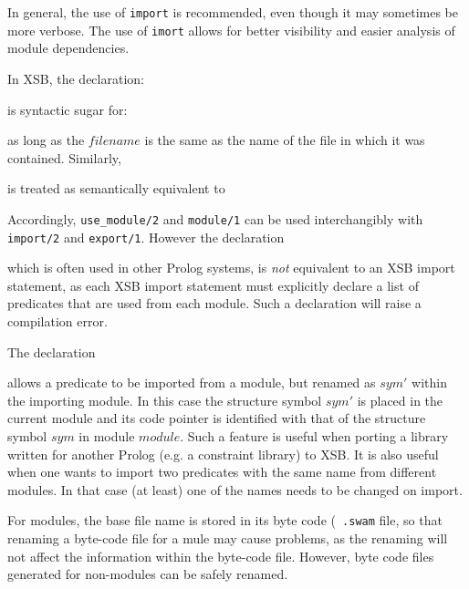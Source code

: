 In general, the use of {\tt import} is recommended, even though it may
sometimes be more verbose.  The use of {\tt imort} allows for better
visibility and easier analysis of module dependencies.

In XSB, the declaration:


\noindent
is syntactic sugar for:


\noindent
as long as the $filename$ is the same as the name of the file in which
it was contained.  Similarly,


\noindent
is treated as semantically equivalent to 


\noindent
Accordingly, {\tt use\_module/2} and {\tt module/1} can be used
interchangibly with {\tt import/2} and {\tt export/1}.  However the
declaration


\noindent
which is often used in other Prolog systems, is {\em not} equivalent
to an XSB import statement, as each XSB import statement must
explicitly declare a list of predicates that are used from each
module.  Such a declaration will raise a compilation error.

The declaration 


\noindent
allows a predicate to be imported from a module, but renamed as $sym'$
within the importing module.  In this case the structure symbol $sym'$
is placed in the current module and its code pointer is identified
with that of the structure symbol $sym$ in module $module$.  Such a
feature is useful when porting a library written for another Prolog
(e.g. a constraint library) to XSB.  It is also useful when one wants
to import two predicates with the same name from different modules.
In that case (at least) one of the names needs to be changed on
import.

For modules, the base file name is stored in its byte code ({\tt
  .swam} file, so that renaming a byte-code file for a mule may cause
problems, as the renaming will not affect the information within the
byte-code file.  However, byte code files generated for non-modules
can be safely renamed.

